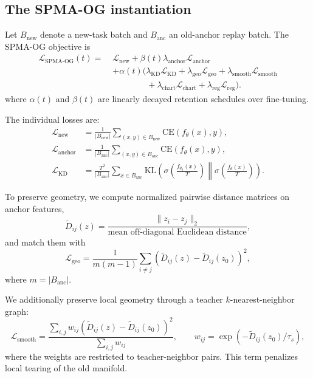 \documentclass[11pt]{article}
\newcommand{\method}{\textsc{SPMA-OG}}
\begin{document}
\subsection{The \method{} instantiation}
Let $B_{\text{new}}$ denote a new-task batch and $B_{\text{anc}}$ an old-anchor replay batch. The \method{} objective is
\begin{equation}
\begin{aligned}
\mathcal{L}_{\mathrm{SPMA\text{-}OG}}(t)
=\;&
\mathcal{L}_{\text{new}}
+ \beta(t)\lambda_{\text{anchor}}\mathcal{L}_{\text{anchor}} \\
&+ \alpha(t)\Big(
\lambda_{\text{KD}}\mathcal{L}_{\text{KD}}
+ \lambda_{\text{geo}}\mathcal{L}_{\text{geo}}
+ \lambda_{\text{smooth}}\mathcal{L}_{\text{smooth}} \\
&\qquad\qquad
+ \lambda_{\text{chart}}\mathcal{L}_{\text{chart}}
+ \lambda_{\text{reg}}\mathcal{L}_{\text{reg}}
\Big).
\end{aligned}
\end{equation}
where $\alpha(t)$ and $\beta(t)$ are linearly decayed retention schedules over fine-tuning.

The individual losses are:
\begin{align*}
\mathcal{L}_{\text{new}}
&=
\frac{1}{|B_{\text{new}}|}
\sum_{(x,y)\in B_{\text{new}}}
\mathrm{CE}(f_\theta(x), y), \\
\mathcal{L}_{\text{anchor}}
&=
\frac{1}{|B_{\text{anc}}|}
\sum_{(x,y)\in B_{\text{anc}}}
\mathrm{CE}(f_\theta(x), y), \\
\mathcal{L}_{\text{KD}}
&=
\frac{T^2}{|B_{\text{anc}}|}
\sum_{x\in B_{\text{anc}}}
\mathrm{KL}\!\left(
\sigma\!\left(\frac{f_{\theta_0}(x)}{T}\right)
\middle\|
\sigma\!\left(\frac{f_{\theta}(x)}{T}\right)
\right).
\end{align*}

To preserve geometry, we compute normalized pairwise distance matrices on anchor features,
\[
\widetilde{D}_{ij}(z) = \frac{\lVert z_i - z_j\rVert_2}{\text{mean off-diagonal Euclidean distance}},
\]
and match them with
\[
\mathcal{L}_{\text{geo}}
=
\frac{1}{m(m-1)}
\sum_{i\neq j}
\left(
\widetilde{D}_{ij}(z) - \widetilde{D}_{ij}(z_0)
\right)^2,
\]
where $m=|B_{\text{anc}}|$.

We additionally preserve local geometry through a teacher $k$-nearest-neighbor graph:
\[
\mathcal{L}_{\text{smooth}}
=
\frac{\sum_{i,j} w_{ij}
\left(
\widetilde{D}_{ij}(z) - \widetilde{D}_{ij}(z_0)
\right)^2}
{\sum_{i,j} w_{ij}},
\qquad
w_{ij}=\exp\!\left(-\widetilde{D}_{ij}(z_0)/\tau_s\right),
\]
where the weights are restricted to teacher-neighbor pairs. This term penalizes local tearing of the old manifold.
\end{document}
